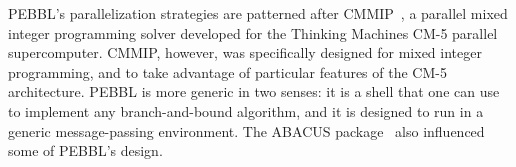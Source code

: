 PEBBL's parallelization strategies are patterned after
CMMIP~\cite{Eck94,Eck97}, a parallel mixed integer programming solver
developed for the Thinking Machines CM-5 parallel supercomputer.
CMMIP, however, was specifically designed for mixed integer
programming, and to take advantage of particular features of the CM-5
architecture.  PEBBL is more generic in two senses: it is a shell that
one can use to implement any branch-and-bound algorithm, and it is
designed to run in a generic message-passing environment.  The ABACUS
package~\cite{JT98} also influenced some of PEBBL's design.
